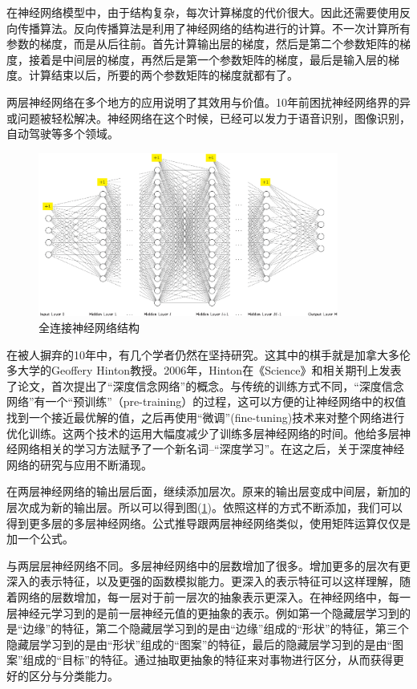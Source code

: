 \documentclass[UTF-8]{progbookcn}
\begin{document}
在神经网络模型中，由于结构复杂，每次计算梯度的代价很大。因此还需要使用反向传播算法。反向传播算法是利用了神经网络的结构进行的计算。不一次计算所有参数的梯度，而是从后往前。首先计算输出层的梯度，然后是第二个参数矩阵的梯度，接着是中间层的梯度，再然后是第一个参数矩阵的梯度，最后是输入层的梯度。计算结束以后，所要的两个参数矩阵的梯度就都有了。

两层神经网络在多个地方的应用说明了其效用与价值。10年前困扰神经网络界的异或问题被轻松解决。神经网络在这个时候，已经可以发力于语音识别，图像识别，自动驾驶等多个领域。
\begin{figure}[!ht]%
  \centering
  \includegraphics[width=0.88\textwidth]{NNF.eps}
  \caption{全连接神经网络结构}
  \label{fig:NNFrame}
\end{figure}




在被人摒弃的10年中，有几个学者仍然在坚持研究。这其中的棋手就是加拿大多伦多大学的Geoffery Hinton教授。2006年，Hinton在《Science》和相关期刊上发表了论文，首次提出了“深度信念网络”的概念\cite{DBLP:journals/neco/HintonOT06}。与传统的训练方式不同，“深度信念网络”有一个“预训练”（pre-training）的过程，这可以方便的让神经网络中的权值找到一个接近最优解的值，之后再使用“微调”(fine-tuning)技术来对整个网络进行优化训练。这两个技术的运用大幅度减少了训练多层神经网络的时间。他给多层神经网络相关的学习方法赋予了一个新名词--“深度学习”。在这之后，关于深度神经网络的研究与应用不断涌现。

在两层神经网络的输出层后面，继续添加层次。原来的输出层变成中间层，新加的层次成为新的输出层。所以可以得到图(\ref{fig:NNFrame})。依照这样的方式不断添加，我们可以得到更多层的多层神经网络。公式推导跟两层神经网络类似，使用矩阵运算仅仅是加一个公式。

与两层层神经网络不同。多层神经网络中的层数增加了很多。增加更多的层次有更深入的表示特征，以及更强的函数模拟能力。更深入的表示特征可以这样理解，随着网络的层数增加，每一层对于前一层次的抽象表示更深入。在神经网络中，每一层神经元学习到的是前一层神经元值的更抽象的表示。例如第一个隐藏层学习到的是“边缘”的特征，第二个隐藏层学习到的是由“边缘”组成的“形状”的特征，第三个隐藏层学习到的是由“形状”组成的“图案”的特征，最后的隐藏层学习到的是由“图案”组成的“目标”的特征。通过抽取更抽象的特征来对事物进行区分，从而获得更好的区分与分类能力。
\end{document}
